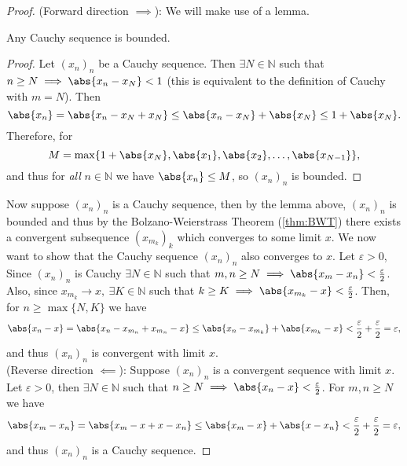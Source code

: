 \documentclass[../real_analysis.tex]{subfiles}
\begin{document}
            \begin{proof}
                (Forward direction $\implies$): We will make use of a lemma.
                \begin{lemma}
                    Any Cauchy sequence is bounded.
                \end{lemma}
                \begin{proof}
                    Let $(x_n)_n$ be a Cauchy sequence. Then $\exists N\in\mathbb{N}$ such that $n\geq N\implies\abs{x_n-x_N}<1$ (this is equivalent to the definition of Cauchy with $m=N$). Then
                    \begin{equation}
                        \abs{x_n}=\abs{x_n-x_N+x_N}\leq\abs{x_n-x_N}+\abs{x_N}\leq 1+\abs{x_N}.
                    \end{equation}
                    Therefore, for
                    \begin{equation}
                        M=\max\{1+\abs{x_N},\abs{x_1},\abs{x_2},\dots,\abs{x_{N-1}}\},
                    \end{equation}
                    and thus for \textit{all} $n\in\mathbb{N}$ we have $\abs{x_n}\leq M$, so $(x_n)_n$ is bounded.
                \end{proof}
                Now suppose $(x_n)_n$ is a Cauchy sequence, then by the lemma above, $(x_n)_n$ is bounded and thus by the Bolzano-Weierstrass Theorem (\ref{thm:BWT}) there exists a convergent subsequence $(x_{m_k})_k$ which converges to some limit $x$. We now want to show that the Cauchy sequence $(x_n)_n$ also converges to $x$. Let $\varepsilon>0$, Since $(x_n)_n$ is Cauchy $\exists N\in\mathbb{N}$ such that $m,n\geq N\implies\abs{x_m-x_n}<\frac{\varepsilon}{2}$. Also, since $x_{m_k}\to x,\ \exists K\in\mathbb{N}$ such that $k\geq K\implies\abs{x_{m_k}-x}<\frac{\varepsilon}{2}$. Then, for $n\geq\max\{N,K\}$ we have
                \begin{equation}
                    \abs{x_n-x}=\abs{x_n-x_{m_n}+x_{m_n}-x}\leq\abs{x_n-x_{m_k}}+\abs{x_{m_k}-x}<\frac{\varepsilon}{2}+\frac{\varepsilon}{2}=\varepsilon,
                \end{equation}
                and thus $(x_n)_n$ is convergent with limit $x$.\\
                (Reverse direction $\impliedby$): Suppose $(x_n)_n$ is a convergent sequence with limit $x$. Let $\varepsilon>0$, then $\exists N\in\mathbb{N}$ such that $n\geq N\implies\abs{x_n-x}<\frac{\varepsilon}{2}$. For $m,n\geq N$ we have
                \begin{equation}
                    \abs{x_m-x_n}=\abs{x_m-x+x-x_n}\leq\abs{x_m-x}+\abs{x-x_n}<\frac{\varepsilon}{2}+\frac{\varepsilon}{2}=\varepsilon,
                \end{equation}
                and thus $(x_n)_n$ is a Cauchy sequence.
            \end{proof}
\end{document}
